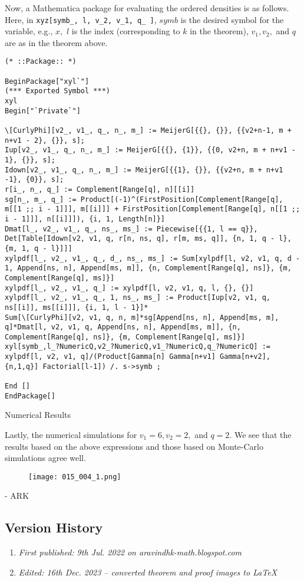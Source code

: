 Now, a Mathematica package for evaluating the ordered densities is as follows. Here, in \verb!xyz[symb_, l, v_2, v_1, q_ ]!, $symb$ is the desired symbol for the variable, e.g., $x,$ $l$ is the index (corresponding to $k$ in the theorem), $v_1, v_2,$ and $q$ are as in the theorem above.

\begin{verbatim}
(* ::Package:: *)

BeginPackage["xyl`"]
(*** Exported Symbol ***)
xyl
Begin["`Private`"]

\[CurlyPhi][v2_, v1_, q_, n_, m_] := MeijerG[{{}, {}}, {{v2+n-1, m + n+v1 - 2}, {}}, s]; 
Iup[v2_, v1_, q_, n_, m_] := MeijerG[{{}, {1}}, {{0, v2+n, m + n+v1 - 1}, {}}, s]; 
Idown[v2_, v1_, q_, n_, m_] := MeijerG[{{1}, {}}, {{v2+n, m + n+v1 -1}, {0}}, s]; 
r[i_, n_, q_] := Complement[Range[q], n][[i]]
sg[n_, m_, q_] := Product[(-1)^(FirstPosition[Complement[Range[q], m[[1 ;; i - 1]]], m[[i]]] + FirstPosition[Complement[Range[q], n[[1 ;; i - 1]]], n[[i]]]), {i, 1, Length[n]}]
Dmat[l_, v2_, v1_, q_, ns_, ms_] := Piecewise[{{1, l == q}}, Det[Table[Idown[v2, v1, q, r[n, ns, q], r[m, ms, q]], {n, 1, q - l}, {m, 1, q - l}]]]
xylpdf[l_, v2_, v1_, q_, d_, ns_, ms_] := Sum[xylpdf[l, v2, v1, q, d - 1, Append[ns, n], Append[ms, m]], {n, Complement[Range[q], ns]}, {m, Complement[Range[q], ms]}]
xylpdf[l_, v2_, v1_, q_] := xylpdf[l, v2, v1, q, l, {}, {}]
xylpdf[l_, v2_, v1_, q_, 1, ns_, ms_] := Product[Iup[v2, v1, q, ns[[i]], ms[[i]]], {i, 1, l - 1}]*
Sum[\[CurlyPhi][v2, v1, q, n, m]*sg[Append[ns, n], Append[ms, m], q]*Dmat[l, v2, v1, q, Append[ns, n], Append[ms, m]], {n, Complement[Range[q], ns]}, {m, Complement[Range[q], ms]}]
xyl[symb_,l_?NumericQ,v2_?NumericQ,v1_?NumericQ,q_?NumericQ] := xylpdf[l, v2, v1, q]/(Product[Gamma[n] Gamma[n+v1] Gamma[n+v2],{n,1,q}] Factorial[l-1]) /. s->symb ;

End []
EndPackage[]
\end{verbatim}

Numerical Results

Lastly, the numerical simulations for $v_1 = 6, v_2 = 2,$ and $q = 2.$ We see that the results based on the above expressions and those based on Monte-Carlo simulations agree well.

\begin{figure}[H]
	\centering
	\texttt{[image: 015\_004\_1.png]}
\end{figure}

- ARK

\subsection{Version History}
\begin{enumerate}
	\item \emph{First published: 9th Jul. 2022 on aravindhk-math.blogspot.com}
	\item \emph{Edited: 16th Dec. 2023 -- converted theorem and proof images to \LaTeX}
\end{enumerate}


